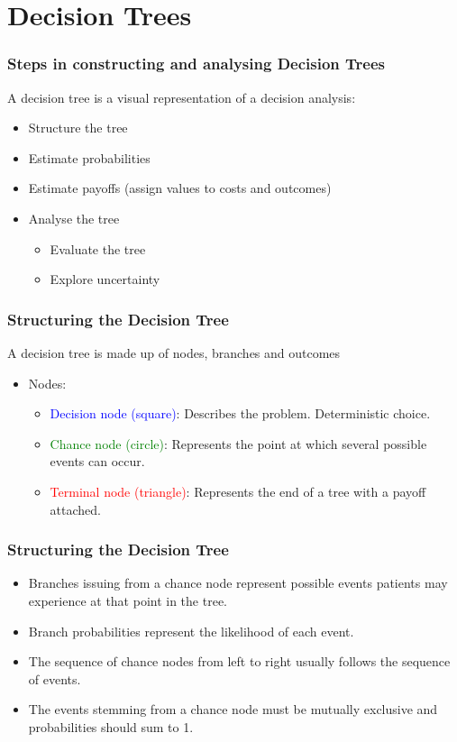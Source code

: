 \section{Decision Trees}

\begin{frame}
\frametitle{Steps in constructing and analysing Decision Trees}
A decision tree is a visual representation of a decision analysis:
	\begin{itemize}
		\item \alert{Structure} the tree
		\pause
		\item Estimate \alert{probabilities}
		\pause
		\item Estimate \alert{payoffs} (assign values to costs and outcomes)
		\pause
		\item Analyse the tree
		\pause
			\begin{itemize}
				\item \alert{Evaluate} the tree
				\item Explore \alert{uncertainty}
			\end{itemize}
	\end{itemize}
\end{frame}

\begin{frame}
\frametitle{Structuring the Decision Tree}
A decision tree is made up of nodes, branches and outcomes

	\begin{itemize}
		\item Nodes:
	\begin{itemize}
		\pause
		\item \textcolor{blue}{Decision node (square)}: Describes the problem. Deterministic choice.
		\pause
		\item \textcolor{green}{Chance node (circle)}: Represents the point at which several possible events can occur.
		\pause
		\item \textcolor{red}{Terminal node (triangle)}: Represents the end of a tree with a payoff attached.
	\end{itemize}
		\end{itemize}
\end{frame}


	\begin{frame}
\frametitle{Structuring the Decision Tree}
	\begin{itemize}
		\item Branches issuing from a chance node represent possible events patients may experience at that point in the tree.
		\item Branch probabilities represent the likelihood of each event.
		\item The sequence of chance nodes from left to right usually follows the sequence of events.
		\item The events stemming from a chance node must be \alert{mutually exclusive} and probabilities should sum to 1.
	\end{itemize}
\end{frame}




